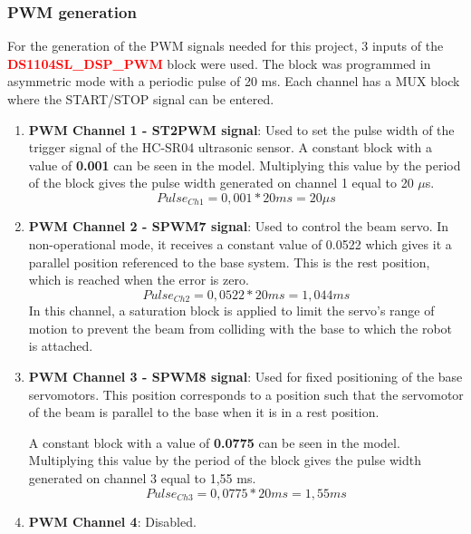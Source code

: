 \subsubsection{PWM generation}
For the generation of the PWM signals needed for this project, 3 inputs of the \textcolor{red}{\textbf{DS1104SL\_DSP\_PWM}} block were used. The block was programmed in asymmetric mode with a periodic pulse of 20 ms. Each channel has a MUX block where the START/STOP signal can be entered.
\begin{enumerate}
    \item \textbf{PWM Channel 1 - ST2PWM signal}: Used to set the pulse width of the trigger signal of the HC-SR04 ultrasonic sensor. A constant block with a value of \textbf{0.001} can be seen in the model. Multiplying this value by the period of the block gives the pulse width generated on channel 1 equal to 20 $\mu$s. 
    \begin{equation}
        Pulse_{Ch1} = 0,001 * 20 ms = 20 \mu s
    \end{equation}
    \item \textbf{PWM Channel 2 - SPWM7 signal}: Used to control the beam servo. In non-operational mode, it receives a constant value of 0.0522 which gives it a parallel position referenced to the base system. This is the rest position, which is reached when the error is zero.
    \begin{equation}
        Pulse_{Ch2} = 0,0522* 20 ms = 1,044 ms
    \end{equation}
   In this channel, a saturation block is applied to limit the servo's range of motion to prevent the beam from colliding with the base to which the robot is attached.
   \item \textbf{PWM Channel 3 - SPWM8 signal}: Used for fixed positioning of the base servomotors. This position corresponds to a position such that the servomotor of the beam is parallel to the base when it is in a rest position.\par
   A constant block with a value of \textbf{0.0775} can be seen in the model. Multiplying this value by the period of the block gives the pulse width generated on channel 3 equal to 1,55 ms. 
    \begin{equation}
        Pulse_{Ch3} = 0,0775* 20 ms = 1,55 ms
    \end{equation}
   \item \textbf{PWM Channel 4}: Disabled.
\end{enumerate}

